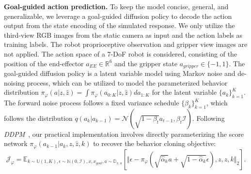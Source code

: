 \textbf{Goal-guided action prediction.} 
To keep the model concise, general, and generalizable, we leverage a goal-guided diffusion policy to decode the action output from the state encoding of the simulated response. 
We only utilize the third-view RGB images from the static camera as input and the action labels as training labels. 
The robot proprioceptive observation and gripper view images are not applied.
The action space of a 7-DoF robot is considered, consisting of the position of the end-effector $a_{EE}\in\mathbb{R}^6$ and the gripper state $a_{gripper}\in\{-1,1\}$. 
The goal-guided diffusion policy is a latent variable model using Markov noise and de-noising process, which can be utilized to model the parameterized behavior distribution $\pi_{\varphi}(a|z,\widehat{z}) = \int\pi_{\varphi}(a_{0:K}|z,\widehat{z})da_{1:K}$ for the latent variable $\{a_k\}_{k=1}^K$. 
The forward noise process follows a fixed variance schedule $\{\beta_k\}_{k=1}^K$, which follows the distribution
$q(a_k|a_{k-1})=\mathcal{N}(\sqrt{1-\beta_t}a_{t-1},\beta_{t}\mathcal{I})$.
Following \textit{DDPM}~\citep{ddpm}, our practical implementation involves directly parameterizing the score network $\pi_{\varphi}(a_{k-1}|a_k,z,\widehat{z},k)$ to recover the behavior cloning objective:
\begin{equation}
\mathcal{J}_{\varphi}=\mathbb{E}_{k\sim\mathbb{U}(1,K),\epsilon\sim\mathbb{N}(0,\mathcal{I}),x,x_{goal},a\sim\mathbb{D}_{x,a}}[\Vert \epsilon-\pi_{\varphi}(\sqrt{\widehat{\alpha}_k}a+\sqrt{1-\widehat{\alpha}_k}\epsilon),z,\widehat{z},k \Vert_2].
\end{equation}
